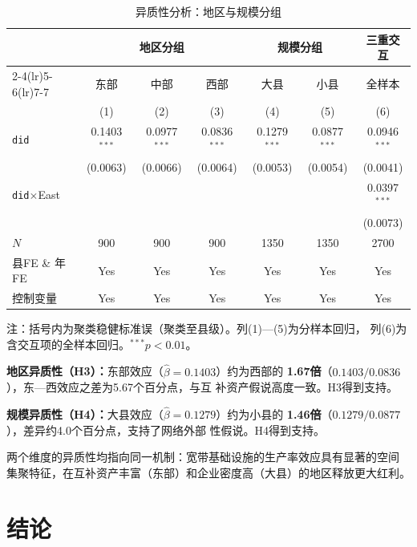 \documentclass[12pt, a4paper]{article}
\begin{document}
\begin{table}[htbp]
\centering
\caption{异质性分析：地区与规模分组}
\label{tab:hetero}
\begin{threeparttable}
\small
\setlength{\tabcolsep}{5pt}
\begin{tabular}{lcccccc}
\toprule
& \multicolumn{3}{c}{地区分组} & \multicolumn{2}{c}{规模分组} & 三重交互 \\
\cmidrule(lr){2-4}\cmidrule(lr){5-6}\cmidrule(lr){7-7}
& 东部 & 中部 & 西部 & 大县 & 小县 & 全样本 \\
& (1) & (2) & (3) & (4) & (5) & (6) \\
\midrule
\texttt{did} & 0.1403$^{***}$ & 0.0977$^{***}$ & 0.0836$^{***}$ & 0.1279$^{***}$ & 0.0877$^{***}$ & 0.0946$^{***}$ \\
 & (0.0063) & (0.0066) & (0.0064) & (0.0053) & (0.0054) & (0.0041) \\
\texttt{did}$\times$East & & & & & & 0.0397$^{***}$ \\
 & & & & & & (0.0073) \\
\midrule
$N$ & 900 & 900 & 900 & 1350 & 1350 & 2700 \\
县FE \& 年FE & Yes & Yes & Yes & Yes & Yes & Yes \\
控制变量 & Yes & Yes & Yes & Yes & Yes & Yes \\
\bottomrule
\end{tabular}
\begin{tablenotes}\small
\item 注：括号内为聚类稳健标准误（聚类至县级）。列(1)—(5)为分样本回归，
  列(6)为含交互项的全样本回归。$^{***}p<0.01$。
\end{tablenotes}
\end{threeparttable}
\end{table}

\textbf{地区异质性（H3）：}东部效应（$\hat\beta=0.1403$）约为西部的
\textbf{1.67倍}（$0.1403/0.0836$），东—西效应之差为5.67个百分点，与互
补资产假说高度一致。H3得到支持。

\textbf{规模异质性（H4）：}大县效应（$\hat\beta=0.1279$）约为小县的
\textbf{1.46倍}（$0.1279/0.0877$），差异约4.0个百分点，支持了网络外部
性假说。H4得到支持。

两个维度的异质性均指向同一机制：宽带基础设施的生产率效应具有显著的空间
集聚特征，在互补资产丰富（东部）和企业密度高（大县）的地区释放更大红利。

\section{结论}
\end{document}
